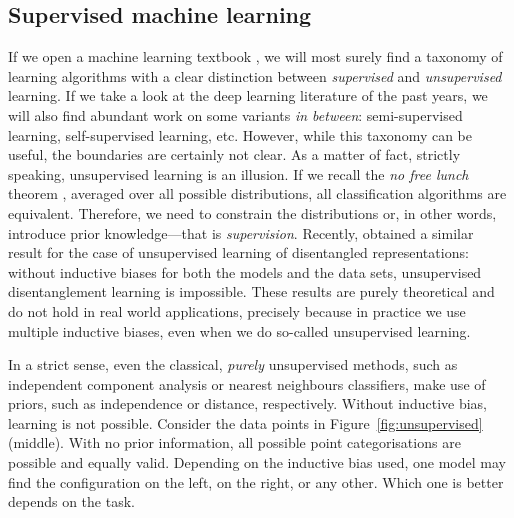 {\subsection{Supervised machine learning}
If we open a machine learning textbook \citep{murphy2012machinelearning, abu2012learningfromdata, goodfellow2016dlbook}, we will most surely find a taxonomy of learning algorithms with a clear distinction between \textit{supervised} and \textit{unsupervised} learning. If we take a look at the deep learning literature of the past years, we will also find abundant work on some variants \textit{in between}: semi-supervised learning, self-supervised learning, etc. However, while this taxonomy can be useful, the boundaries are certainly not clear. As a matter of fact, strictly speaking, unsupervised learning is an illusion. If we recall the \textit{no free lunch} theorem \citep{wolpert1996nofreelunch}, averaged over all possible distributions, all classification algorithms are equivalent. Therefore, we need to constrain the distributions or, in other words, introduce prior knowledge---that is \textit{supervision}. Recently, \citet{locatello2018disentanglement} obtained a similar result for the case of unsupervised learning of disentangled representations: without inductive biases for both the models and the data sets, unsupervised disentanglement learning is impossible. These results are purely theoretical and do not hold in real world applications, precisely because in practice we use multiple inductive biases, even when we do so-called unsupervised learning.  

In a strict sense, even the classical, \textit{purely} unsupervised methods, such as independent component analysis or nearest neighbours classifiers, make use of priors, such as independence or distance, respectively. Without inductive bias, learning is not possible. Consider the data points in Figure~\ref{fig:unsupervised} (middle). With no prior information, all possible point categorisations are possible and equally valid. Depending on the inductive bias used, one model may find the configuration on the left, on the right, or any other. Which one is better depends on the task.

}
